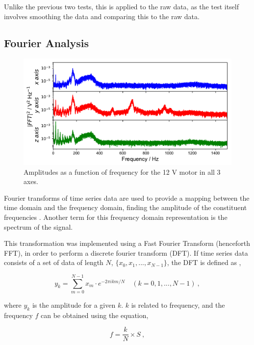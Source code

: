 Unlike the previous two tests, this is applied to the raw data, as the test itself involves smoothing the data and comparing this to the raw data.


\subsection{Fourier Analysis}

\begin{figure}[t]
    \includegraphics[width=1.0\textwidth]{fig/freq_large_4Vnowater.pdf}
    \caption[Fourier Spectrum of 12 V motor in $xys$ axes]{Amplitudes as a function of frequency for the 12 V motor in all 3 axes. }
    \label{fig:frequencies}
\end{figure}

Fourier transforms of time series data are used to provide a mapping between the time domain and the frequency domain, finding the amplitude of the constituent frequencies \cite{hsu_1984}. Another term for this frequency domain representation is the spectrum of the signal. 

This transformation was implemented using a Fast Fourier Transform (henceforth FFT), in order to perform a discrete fourier transform (DFT). If time series data consists of a set of data of length $N$, $\{ x_0, x_1,...,x_{N-1} \}$, the DFT is defined as \cite{hsu_1984},

\begin{equation}
    y_k = \sum_{m=0}^{N-1} x_m \cdot e^{-2\pi ikm/N} \quad (k = 0,1,...,N-1)~,
    \label{eq:DFT}
\end{equation}

where $y_k$ is the amplitude for a given $k$. $k$ is related to frequency, and the frequency $f$ can be obtained using the equation,

\begin{equation}
    f = \dfrac{k}{N} \times S~,
    \label{eq:freq_from_k}
\end{equation}

